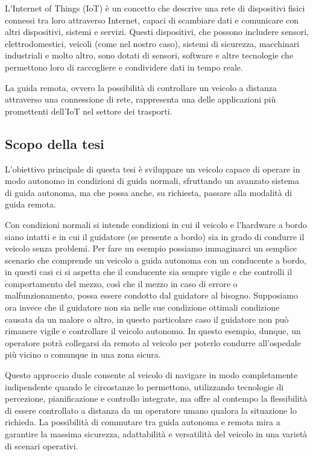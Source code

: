 \noindent L'Internet of Things (IoT) è un concetto che descrive una rete di dispositivi fisici connessi tra loro attraverso Internet, capaci di scambiare dati e comunicare con altri dispositivi, sistemi e servizi. Questi dispositivi, che possono includere sensori, elettrodomestici, veicoli (come nel nostro caso), sistemi di sicurezza, macchinari industriali e molto altro, sono dotati di sensori, software e altre tecnologie che permettono loro di raccogliere e condividere dati in tempo reale.

\noindent La guida remota, ovvero la possibilità di controllare un veicolo a distanza attraverso una connessione di rete, rappresenta una delle applicazioni più promettenti dell'IoT nel settore dei trasporti.

\subsection{Scopo della tesi}
L'obiettivo principale di questa tesi è sviluppare un veicolo capace di operare in modo autonomo in condizioni di guida normali, sfruttando un avanzato sistema di guida autonoma, ma che possa anche, su richiesta, passare alla modalità di guida remota.

\noindent Con condizioni normali si intende condizioni in cui il veicolo e l'hardware a bordo siano intatti e in cui il guidatore (se presente a bordo) sia in grado di condurre il veicolo senza problemi. Per fare un esempio possiamo immaginarci un semplice scenario che comprende un veicolo a guida autonoma con un conducente a bordo, in questi casi ci si aspetta che il conducente sia sempre vigile e che controlli il comportamento del mezzo, così che il mezzo in caso di errore o malfunzionamento, possa essere condotto dal guidatore al bisogno. Supposiamo ora invece che il guidatore non sia nelle sue condizione ottimali condizione causata da un malore o altro, in questo particolare caso il guidatore non può rimanere vigile e controllare il veicolo autonomo. In questo esempio, dunque, un operatore potrà collegarsi da remoto al veicolo per poterlo condurre all'ospedale più vicino o comunque in una zona sicura.

\noindent Questo approccio duale consente al veicolo di navigare in modo completamente indipendente quando le circostanze lo permettono, utilizzando tecnologie di percezione, pianificazione e controllo integrate, ma offre al contempo la flessibilità di essere controllato a distanza da un operatore umano qualora la situazione lo richieda. La possibilità di commutare tra guida autonoma e remota mira a garantire la massima sicurezza, adattabilità e versatilità del veicolo in una varietà di scenari operativi.

